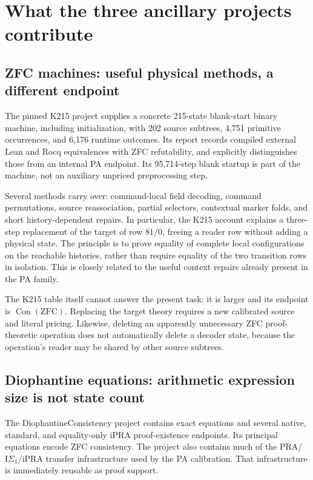 \documentclass[11pt]{article}
\newcommand{\IPRA}{\mathrm{iPRA}}
\newcommand{\IS}{\mathrm{I}\Sigma_1}
\newcommand{\Con}{\operatorname{Con}}
\begin{document}
\section{What the three ancillary projects contribute}

\subsection{ZFC machines: useful physical methods, a different endpoint}

The pinned K215 project supplies a concrete 215-state blank-start binary
machine, including initialization, with 202 source subtrees, 4,751
primitive occurrences, and 6,176 runtime outcomes.  Its report records
compiled external Lean and Rocq equivalences with ZFC refutability, and
explicitly distinguishes those from an internal PA endpoint.  Its
95,714-step blank startup is part of the machine, not an auxiliary
unpriced preprocessing step.\cite{k215}

Several methods carry over: command-local field decoding, command
permutations, source reassociation, partial selectors, contextual
marker folds, and short history-dependent repairs.  In particular,
the K215 account explains a three-step replacement of the target of
row \(81/0\), freeing a reader row without adding a physical state.
The principle is to prove equality of complete local configurations
on the reachable histories, rather than require equality of the two
transition rows in isolation.  This is closely related to the useful
context repairs already present in the PA family.\cite{k215}

The K215 table itself cannot answer the present task: it is larger and
its endpoint is \(\Con(\mathrm{ZFC})\).  Replacing the target theory
requires a new calibrated source and literal pricing.  Likewise,
deleting an apparently unnecessary ZFC proof-theoretic operation does
not automatically delete a decoder state, because the operation's
reader may be shared by other source subtrees.

\subsection{Diophantine equations: arithmetic expression size is not state count}

The DiophantineConsistency project contains exact equations and several
native, standard, and equality-only \(\IPRA\) proof-existence endpoints.
Its principal equations encode ZFC consistency.  The project also
contains much of the PRA/\(\IS\)/iPRA transfer infrastructure used by
the PA calibration.  That infrastructure is immediately reusable as
proof support.\cite{diophantine}
\end{document}

